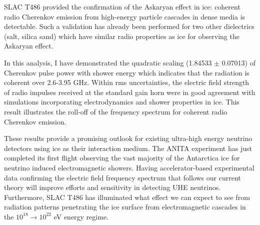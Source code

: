 SLAC T486 provided the confirmation of the Askaryan effect in ice:  coherent radio Cherenkov emission from high-energy particle cascades in dense media is detectable.  Such a validation has already been performed for two other dielectrics (salt, silica sand) which have similar radio properties as ice for observing the Askaryan effect.

\par In this analysis, I have demonstrated the quadratic scaling (1.84533 $\pm$ 0.07013) of Cherenkov pulse power with shower energy which indicates that the radiation is coherent over 2.6-3.95 GHz.  Within rms uncertainties, the electric field strength of radio impulses received at the standard gain horn were in good agreement with simulations incorporating electrodynamics and shower properties in ice.  This result illustrates the roll-off of the frequency spectrum for coherent radio Cherenkov emission.

\par These results provide a promising outlook for existing ultra-high energy neutrino detectors using ice as their interaction medium.  The ANITA experiment has just completed its first flight observing the vast majority of the Antarctica ice for neutrino induced electromagnetic showers.  Having accelerator-based experimental data confirming the electric field frequency spectrum that follows our current theory will improve efforts and sensitivity in detecting UHE neutrinos.  Furthermore, SLAC T486 has illuminated what effect we can expect to see from radiation patterns penetrating the ice surface from electromagnetic cascades in the  $10^{18}\rightarrow10^{22}$ eV energy regime.